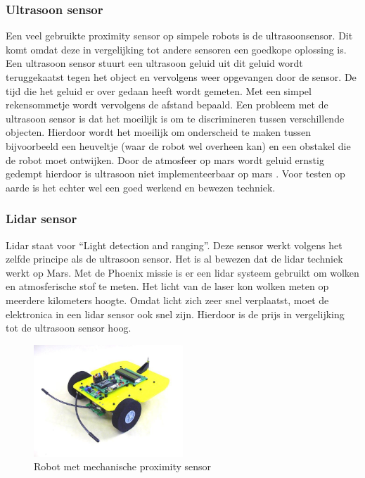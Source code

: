 \documentclass[10pt,a4paper]{article}
\begin{document}
\subsubsection{Ultrasoon sensor}
Een veel gebruikte proximity sensor op simpele robots is de ultrasoonsensor. Dit komt omdat deze in vergelijking tot andere sensoren een goedkope oplossing is. Een ultrasoon sensor stuurt een ultrasoon geluid uit dit geluid wordt teruggekaatst tegen het object en vervolgens weer opgevangen door de sensor. De tijd die het geluid er over gedaan heeft wordt gemeten. Met een simpel rekensommetje wordt vervolgens de afstand bepaald. Een probleem met de ultrasoon sensor is dat het moeilijk is om te discrimineren tussen verschillende objecten. Hierdoor wordt het moeilijk om onderscheid te maken tussen bijvoorbeeld een heuveltje (waar de robot wel overheen kan) en een obstakel die de robot moet ontwijken. Door de atmosfeer op mars wordt geluid ernstig gedempt hierdoor is ultrasoon niet implementeerbaar op mars \cite{soundonmars}. Voor testen op aarde is het echter wel een goed werkend en bewezen techniek.

\subsubsection{Lidar sensor}
Lidar staat voor “Light detection and ranging”. Deze sensor werkt volgens het zelfde principe als de ultrasoon sensor. Het is al bewezen dat de lidar techniek werkt op Mars. Met de Phoenix missie is er een lidar systeem gebruikt om wolken en atmosferische stof te meten\cite{lidarmars}. Het licht van de laser kon wolken meten op meerdere kilometers hoogte. Omdat licht zich zeer snel verplaatst, moet de elektronica in een lidar sensor ook snel zijn. Hierdoor is de prijs in vergelijking tot de ultrasoon sensor hoog.

\begin{figure}[!ht]

  \centering
      \includegraphics[width=0.5\textwidth]{voelsprieten.jpg}
  \caption{Robot met mechanische proximity sensor}  \label{voelspriet}
 
\end{figure}
\end{document}
